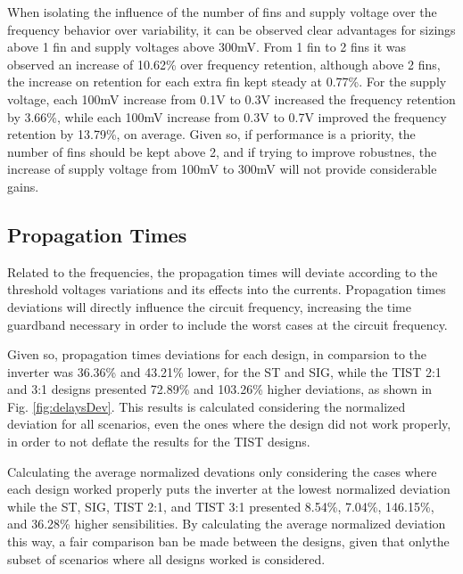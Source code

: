 \documentclass[pgmicro,mestrado,english]{iiufrgs}
\begin{document}
When isolating the influence of the number of fins and supply voltage over the frequency behavior over variability, it can be observed clear advantages for sizings above 1 fin and supply voltages above 300mV. From 1 fin to 2 fins it was observed an increase of 10.62\% over frequency retention, although above 2 fins, the increase on retention for each extra fin kept steady at 0.77\%. For the supply voltage, each 100mV increase from 0.1V to 0.3V increased the frequency retention by 3.66\%, while each 100mV increase from 0.3V to 0.7V improved the frequency retention by 13.79\%, on average. Given so, if performance is a priority, the number of fins should be kept above 2, and if trying to improve robustnes, the increase of supply voltage from 100mV to 300mV will not provide considerable gains.


\subsection{Propagation Times}

\vspace{-0.5cm}

Related to the frequencies, the propagation times will deviate according to the threshold voltages variations and its effects into the currents. Propagation times deviations will directly influence the circuit frequency, increasing the time guardband necessary in order to include the worst cases at the circuit frequency.

Given so, propagation times deviations for each design, in comparsion to the inverter was 36.36\% and 43.21\% lower, for the ST and SIG, while the TIST 2:1 and 3:1 designs presented 72.89\% and 103.26\% higher deviations, as shown in Fig. \ref{fig:delaysDev}. This results is calculated considering the normalized deviation for all scenarios, even the ones where the design did not work properly, in order to not deflate the results for the TIST designs.

Calculating the average normalized devations only considering the cases where each design worked properly puts the inverter at the lowest normalized deviation while the ST, SIG, TIST 2:1, and TIST 3:1 presented 8.54\%, 7.04\%, 146.15\%, and 36.28\% higher sensibilities. By calculating the average normalized deviation this way, a fair comparison ban be made between the designs, given that onlythe subset of scenarios where all designs worked is considered.
\end{document}
